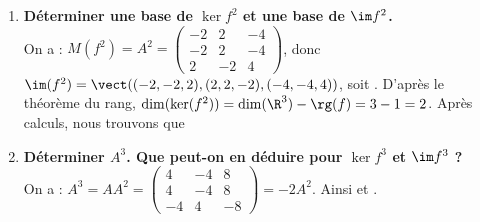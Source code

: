 \documentclass[a4paper, 11pt,reqno]{article}
\begin{document}
\begin{correction}
\begin{enumerate}
		\item \textbf{D\'eterminer une base de $\ker f^2$ et une base de $\im f^2$.}\\
		      On a : $ M(f^2) = A^2 = \left(\begin{array}{rrr}
					      -2 & 2  & -4 \\
					      -2 & 2  & -4 \\
					      2  & -2 & 4
				      \end{array} \right) $,
		      donc $\im(f^2) = \vect((-2,-2,2),(2,2,-2),(-4,-4,4))$, soit . D'apr\`es le th\'eor\`eme du rang, $\dim(\ker(f^2)) = \dim(\R^3) - \rg(f)=3-1 = 2$. Apr\`es calculs, nous trouvons que 
		\item \textbf{D\'eterminer $A^3$. Que peut-on en d\'eduire pour $\ker f^3$ et $\im f^3$ ?}\\
		      On a : $  A^3 = A A^2 =  \left(\begin{array}{rrr}
					      4  & -4 & 8  \\
					      4  & -4 & 8  \\
					      -4 & 4  & -8
				      \end{array} \right) = -2 A^2. $
		      Ainsi  et .
	\end{enumerate}
\end{correction}
\end{document}
